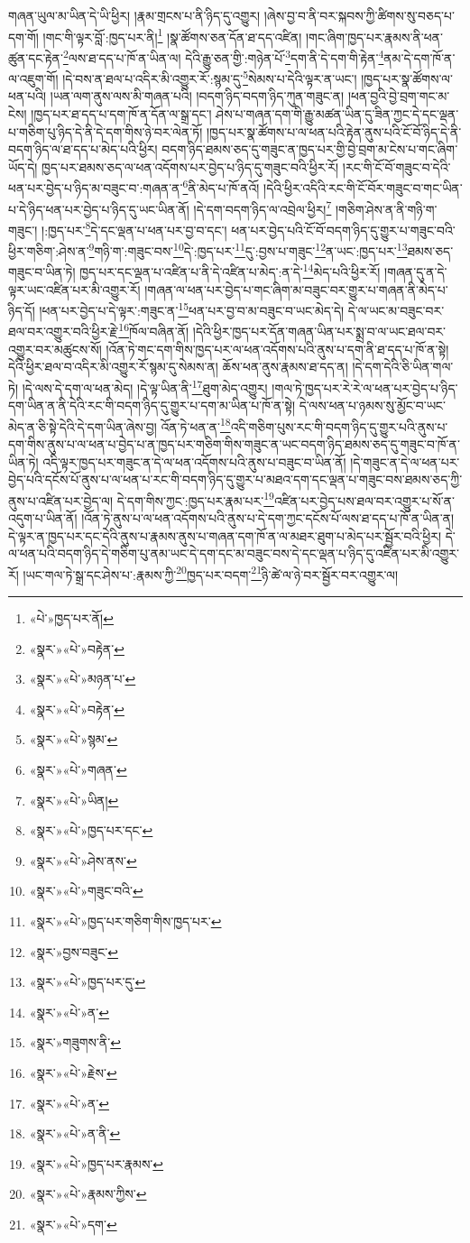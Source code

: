 གཞན་ཡུལ་མ་ཡིན་དེ་ཡི་ཕྱིར། །རྣམ་གྲངས་པ་ནི་ཉིད་དུ་འགྱུར། །ཞེས་བྱ་བ་ནི་བར་སྐབས་ཀྱི་ཚིགས་སུ་བཅད་པ་དག་གོ། །གང་གི་ལྟར་བློ་:ཁྱད་པར་ནི།\footnote{«པེ་»ཁྱད་པར་ནོ།} །སྣ་ཚོགས་ཅན་དོན་ཐ་དད་འཛིན། །གང་ཞིག་ཁྱད་པར་རྣམས་ནི་ཕན་ཚུན་དང་རྟེན་\footnote{«སྣར་»«པེ་»བརྟེན་}ལས་ཐ་དད་པ་ཁོ་ན་ཡིན་ལ། དེའི་རྒྱུ་ཅན་གྱི་:གཉེན་པོ་\footnote{«སྣར་»«པེ་»མཉན་པ་}དག་ནི་དེ་དག་གི་རྟེན་\footnote{«སྣར་»«པེ་»བརྟེན་}ནམ་དེ་དག་ཁོ་ན་ལ་འཇུག་གོ། །དེ་བས་ན་ཐལ་པ་འདིར་མི་འགྱུར་རོ་:སྙམ་དུ་\footnote{«སྣར་»«པེ་»སྙམ་}སེམས་པ་དེའི་ལྟར་ན་ཡང་། །ཁྱད་པར་སྣ་ཚོགས་ལ་ཕན་པའི། །ཡན་ལག་ནུས་ལས་མི་གཞན་པའི། །བདག་ཉིད་བདག་ཉིད་ཀུན་གཟུང་ན། །ཕན་བྱའི་བྱེ་བྲག་གང་མ་ངེས། །ཁྱད་པར་ཐ་དད་པ་དག་ཁོ་ན་དོན་ལ་སྒྲ་དང་། ཤེས་པ་གཞན་དག་གི་རྒྱུ་མཚན་ཡིན་དུ་ཟིན་ཀྱང་དེ་དང་ལྡན་པ་གཅིག་པུ་ཉིད་དེ་ནི་དེ་དག་གིས་ཉེ་བར་ལེན་ཏོ། །ཁྱད་པར་སྣ་ཚོགས་པ་ལ་ཕན་པའི་རྟེན་ནུས་པའི་ངོ་བོ་ཉིད་དེ་ནི་བདག་ཉིད་ལ་ཐ་དད་པ་མེད་པའི་ཕྱིར། བདག་ཉིད་ཐམས་ཅད་དུ་གཟུང་ན་ཁྱད་པར་གྱི་བྱེ་བྲག་མ་ངེས་པ་གང་ཞིག་ཡོད་དེ། ཁྱད་པར་ཐམས་ཅད་ལ་ཕན་འདོགས་པར་བྱེད་པ་ཉིད་དུ་གཟུང་བའི་ཕྱིར་རོ། །རང་གི་ངོ་བོ་གཟུང་བ་དེའི་ཕན་པར་བྱེད་པ་ཉིད་མ་བཟུང་བ་:གཞན་ན་\footnote{«སྣར་»«པེ་»གཞན་}ནི་མེད་པ་ཁོ་ནའོ། །དེའི་ཕྱིར་འདིའི་རང་གི་ངོ་བོར་གཟུང་བ་གང་ཡིན་པ་དེ་ཉིད་ཕན་པར་བྱེད་པ་ཉིད་དུ་ཡང་ཡིན་ནོ། །དེ་དག་བདག་ཉིད་ལ་འབྲེལ་ཕྱིར།\footnote{«སྣར་»«པེ་»ཡིན།} །གཅིག་ཤེས་ན་ནི་གཉི་ག་གཟུང་། །:ཁྱད་པར་\footnote{«སྣར་»«པེ་»ཁྱད་པར་དང་}དེ་དང་ལྡན་པ་ཕན་པར་བྱ་བ་དང་། ཕན་པར་བྱེད་པའི་ངོ་བོ་བདག་ཉིད་དུ་གྱུར་པ་གཟུང་བའི་ཕྱིར་གཅིག་:ཤེས་ན་\footnote{«སྣར་»«པེ་»ཤེས་ནས་}གཉི་ག་:གཟུང་བས་\footnote{«སྣར་»«པེ་»གཟུང་བའི་}དེ་:ཁྱད་པར་\footnote{«སྣར་»«པེ་»ཁྱད་པར་གཅིག་གིས་ཁྱད་པར་}དུ་:བྱས་པ་གཟུང་\footnote{«སྣར་»བྱས་བཟུང་}ན་ཡང་:ཁྱད་པར་\footnote{«སྣར་»«པེ་»ཁྱད་པར་དུ་}ཐམས་ཅད་གཟུང་བ་ཡིན་ཏེ། ཁྱད་པར་དང་ལྡན་པ་འཛིན་པ་ནི་དེ་འཛིན་པ་མེད་:ན་དེ་\footnote{«སྣར་»«པེ་»ན་}མེད་པའི་ཕྱིར་རོ། །གཞན་དུ་ན་དེ་ལྟར་ཡང་འཛིན་པར་མི་འགྱུར་རོ། །གཞན་ལ་ཕན་པར་བྱེད་པ་གང་ཞིག་མ་བཟུང་བར་གྱུར་པ་གཞན་ནི་མེད་པ་ཉིད་དོ། །ཕན་པར་བྱེད་པ་དེ་ལྟར་:གཟུང་ན་\footnote{«སྣར་»གཟུགས་ནི་}ཕན་པར་བྱ་བ་མ་བཟུང་བ་ཡང་མེད་དེ། དེ་ལ་ཡང་མ་བཟུང་བར་ཐལ་བར་འགྱུར་བའི་ཕྱིར་རྗེ་\footnote{«སྣར་»«པེ་»རྗེས་}ཁོལ་བཞིན་ནོ། །དེའི་ཕྱིར་ཁྱད་པར་དོན་གཞན་ཡིན་པར་སྨྲ་བ་ལ་ཡང་ཐལ་བར་འགྱུར་བར་མཚུངས་སོ། །འོན་ཏེ་གང་དག་གིས་ཁྱད་པར་ལ་ཕན་འདོགས་པའི་ནུས་པ་དག་ནི་ཐ་དད་པ་ཁོ་ན་སྟེ། དེའི་ཕྱིར་ཐལ་བ་འདིར་མི་འགྱུར་རོ་སྙམ་དུ་སེམས་ན། ཆོས་ཕན་ནུས་རྣམས་ཐ་དད་ན། །དེ་དག་དེའི་ཅི་ཡིན་གལ་ཏེ། །དེ་ལས་དེ་དག་ལ་ཕན་མེད། །དེ་ལྟ་ཡིན་ནི་\footnote{«སྣར་»«པེ་»ན་}ཐུག་མེད་འགྱུར། །གལ་ཏེ་ཁྱད་པར་རེ་རེ་ལ་ཕན་པར་བྱེད་པ་ཉིད་དག་ཡིན་ན་ནི་དེའི་རང་གི་བདག་ཉིད་དུ་གྱུར་པ་དག་མ་ཡིན་པ་ཁོ་ན་སྟེ། དེ་ལས་ཕན་པ་ཉམས་སུ་མྱོང་བ་ཡང་མེད་ན་ཅི་སྟེ་དེའི་དེ་དག་ཡིན་ཞེས་བྱ། འོན་ཏེ་ཕན་ན་\footnote{«སྣར་»«པེ་»ན་ནི་}འདི་གཅིག་པུས་རང་གི་བདག་ཉིད་དུ་གྱུར་པའི་ནུས་པ་དག་གིས་ནུས་པ་ལ་ཕན་པ་བྱེད་པ་ན་ཁྱད་པར་གཅིག་གིས་གཟུང་ན་ཡང་བདག་ཉིད་ཐམས་ཅད་དུ་གཟུང་བ་ཁོ་ན་ཡིན་ཏེ། འདི་ལྟར་ཁྱད་པར་གཟུང་ན་དེ་ལ་ཕན་འདོགས་པའི་ནུས་པ་བཟུང་བ་ཡིན་ནོ། །དེ་གཟུང་ན་དེ་ལ་ཕན་པར་བྱེད་པའི་དངོས་པོ་ནུས་པ་ལ་ཕན་པ་རང་གི་བདག་ཉིད་དུ་གྱུར་པ་མཐའ་དག་དང་ལྡན་པ་གཟུང་བས་ཐམས་ཅད་ཀྱི་ནུས་པ་འཛིན་པར་བྱེད་ལ། དེ་དག་གིས་ཀྱང་:ཁྱད་པར་རྣམ་པར་\footnote{«སྣར་»«པེ་»ཁྱད་པར་རྣམས་}འཛིན་པར་བྱེད་པས་ཐལ་བར་འགྱུར་པ་སོ་ན་འདུག་པ་ཡིན་ནོ། །འོན་ཏེ་ནུས་པ་ལ་ཕན་འདོགས་པའི་ནུས་པ་དེ་དག་ཀྱང་དངོས་པོ་ལས་ཐ་དད་པ་ཁོ་ན་ཡིན་ན། དེ་ལྟར་ན་ཁྱད་པར་དང་དེའི་ནུས་པ་རྣམས་ནུས་པ་གཞན་དག་ཁོ་ན་ལ་མཐར་ཐུག་པ་མེད་པར་སྦྱོར་བའི་ཕྱིར། དེ་ལ་ཕན་པའི་བདག་ཉིད་དེ་གཅིག་པུ་ནམ་ཡང་དེ་དག་དང་མ་བཟུང་བས་དེ་དང་ལྡན་པ་ཉིད་དུ་འཛིན་པར་མི་འགྱུར་རོ། །ཡང་གལ་ཏེ་སྒྲ་དང་ཤེས་པ་:རྣམས་ཀྱི་\footnote{«སྣར་»«པེ་»རྣམས་ཀྱིས་}ཁྱད་པར་བདག་\footnote{«སྣར་»«པེ་»དག་}ཉི་ཚེ་ལ་ཉེ་བར་སྦྱོར་བར་འགྱུར་ལ། 